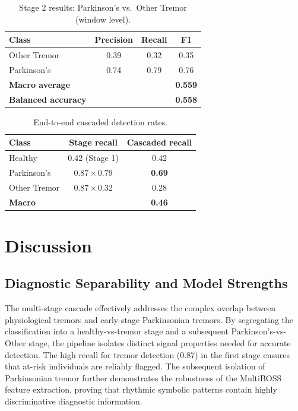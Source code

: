 \documentclass[12pt, a4paper]{article}
\begin{document}
\begin{table}[htbp]
  \centering
  \caption{Stage 2 results: Parkinson's vs.\ Other Tremor (window level).}
  \label{tab:stage2}
  \begin{tabular}{lccc}
    \toprule
    Class & Precision & Recall & F1 \\
    \midrule
    Other Tremor & 0.39 & 0.32 & 0.35 \\
    Parkinson's  & 0.74 & 0.79 & 0.76 \\
    \midrule
    \textbf{Macro average} & & & \textbf{0.559} \\
    \textbf{Balanced accuracy} & & & \textbf{0.558} \\
    \bottomrule
  \end{tabular}
\end{table}

\begin{table}[htbp]
  \centering
  \caption{End-to-end cascaded detection rates.}
  \label{tab:e2e}
  \begin{tabular}{lcc}
    \toprule
    Class & Stage recall & Cascaded recall \\
    \midrule
    Healthy      & 0.42 (Stage 1) & 0.42 \\
    Parkinson's  & $0.87 \times 0.79$ & \textbf{0.69} \\
    Other Tremor & $0.87 \times 0.32$ & 0.28 \\
    \midrule
    \textbf{Macro} & & \textbf{0.46} \\
    \bottomrule
  \end{tabular}
\end{table}


\section{Discussion}
\label{sec:discussion}

\subsection{Diagnostic Separability and Model Strengths}

The multi-stage cascade effectively addresses the complex overlap between physiological tremors and early-stage Parkinsonian tremors. By segregating the classification into a healthy-vs-tremor stage and a subsequent Parkinson's-vs-Other stage, the pipeline isolates distinct signal properties needed for accurate detection. The high recall for tremor detection (0.87) in the first stage ensures that at-risk individuals are reliably flagged. The subsequent isolation of Parkinsonian tremor further demonstrates the robustness of the MultiBOSS feature extraction, proving that rhythmic symbolic patterns contain highly discriminative diagnostic information.
\end{document}
